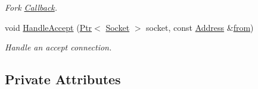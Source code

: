 \begin{DoxyCompactItemize}
\begin{DoxyCompactList}\small\item\em Fork \hyperlink{classns3_1_1Callback}{Callback}. \end{DoxyCompactList}\item 
void \hyperlink{classns3_1_1TcpGeneralTest_a53bb4bcfcf8263d895a8f134d57d0865}{Handle\+Accept} (\hyperlink{classns3_1_1Ptr}{Ptr}$<$ \hyperlink{classns3_1_1Socket}{Socket} $>$ socket, const \hyperlink{classns3_1_1Address}{Address} \&\hyperlink{lte__amc_8m_a1b4c81ff74eb1a626b5ade44c81004b3}{from})
\begin{DoxyCompactList}\small\item\em Handle an accept connection. \end{DoxyCompactList}\end{DoxyCompactItemize}
\subsection*{Private Attributes}

